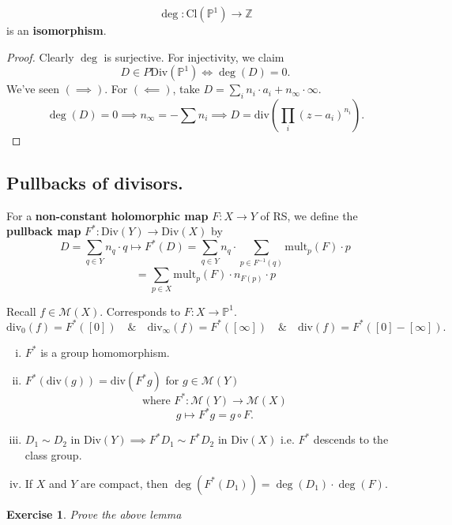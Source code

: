 \documentclass{article}
\newtheorem{exercise}{Exercise}
\begin{document}
\begin{lemma}
    $$\deg: \text{Cl}(\mathbb{P}^1) \to \mathbb{Z}$$
    is an \textbf{isomorphism}.
\end{lemma}

\begin{proof}
    Clearly $\deg$ is surjective. For injectivity, we claim
    $$D \in P\text{Div}(\mathbb{P}^1) \iff \deg(D) = 0.$$
    We've seen $(\implies)$. For $(\impliedby)$, take $D = \sum_{i} n_i \cdot a_i + n_{\infty} \cdot \infty$.
    $$\deg(D) = 0 \implies n_{\infty} = - \sum n_i \implies D = \text{div}\left( \prod_i (z-a_i)^{n_i} \right).$$
\end{proof}

\subsection{Pullbacks of divisors.}

\begin{definition}
    For a \textbf{non-constant holomorphic map} $F: X \to Y$ of RS, we define the \textbf{pullback map} $F^*: \text{Div}(Y) \to \text{Div}(X)$ by
    $$D = \sum_{q \in Y} n_q \cdot q \mapsto F^*(D) = \sum_{q \in Y} n_q \cdot \sum_{p \in F^{-1}(q)} \text{mult}_p(F) \cdot p$$
    $$= \sum_{p \in X} \text{mult}_p(F) \cdot n_{F(p)} \cdot p$$
\end{definition}

\begin{example}
    Recall $f \in \mathcal{M}(X)$. Corresponds to $F: X \to \mathbb{P}^1$.
    $$\text{div}_0(f) = F^*([0]) \quad \& \quad \text{div}_\infty(f) = F^*([\infty]) \quad \& \quad \text{div}(f) = F^*([0] - [\infty]).$$
\end{example}

\begin{lemma}
    \begin{enumerate}[(i)]
        \item $F^*$ is a group homomorphism.
        \item $F^*(\text{div}(g)) = \text{div}(F^*g)$ for $g \in \mathcal{M}(Y)$
        $$\text{where } F^*: \mathcal{M}(Y) \to \mathcal{M}(X)$$
        $$g \mapsto F^*g = g \circ F.$$
        \item $D_1 \sim D_2 \text{ in } \text{Div}(Y) \implies F^* D_1 \sim F^* D_2 \text{ in } \text{Div}(X)$
        i.e. $F^*$ descends to the class group.
        \item If $X$ and $Y$ are compact, then $\deg(F^*(D_1)) = \deg(D_1) \cdot \deg(F)$.
    \end{enumerate}
\end{lemma}
    \begin{exercise}
        Prove the above lemma
    \end{exercise}
\end{document}
